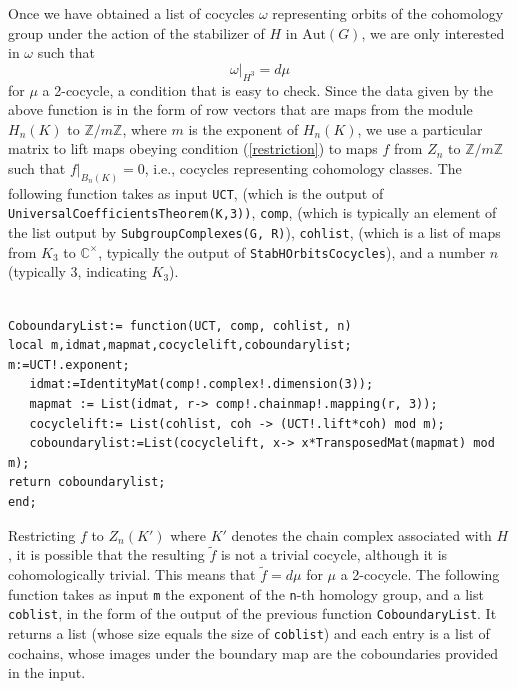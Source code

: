 \documentclass[11pt]{book}
\theoremstyle{Rem}
\theoremstyle{definition}
\numberwithin{equation}{section}
\newcommand\lstl{\lstinline}
\newcommand\CC{\mathbb C}
\newcommand\ZZ{\mathbb Z}
\begin{document}
Once we have obtained a list of cocycles $\omega$ representing orbits of the cohomology group under the action of the stabilizer of $H$ in $\text{Aut}(G)$, we are only interested in $\omega$ such that \begin{equation}\label{restriction}
	\omega|_{H^3} = d\mu
\end{equation} for $\mu$ a 2-cocycle, a condition that is easy to check. Since the data given by the above function is in the form of row vectors that are maps from the module $H_n(K)$ to $\ZZ/m\ZZ$, where $m$ is the exponent of $H_n(K)$, we use a particular matrix to lift maps obeying condition (\ref{restriction}) to maps $f$ from $Z_n$ to $\ZZ/m\ZZ$ such that $f|_{B_n(K)} = 0$, i.e., cocycles representing cohomology classes. The following function takes as input \lstl{UCT}, (which is the output of \lstl{UniversalCoefficientsTheorem(K,3))}, \lstl{comp}, (which is typically an element of the list output  by \lstl{SubgroupComplexes(G, R)}), \lstl{cohlist}, (which is a list of maps from $K_3$ to $\CC^\times$, typically the output of \lstl{StabHOrbitsCocycles}), and a number $n$ (typically 3, indicating $K_3$). 

\begin{lstlisting}

CoboundaryList:= function(UCT, comp, cohlist, n)
local m,idmat,mapmat,cocyclelift,coboundarylist;
m:=UCT!.exponent;
   idmat:=IdentityMat(comp!.complex!.dimension(3));
   mapmat := List(idmat, r-> comp!.chainmap!.mapping(r, 3));
   cocyclelift:= List(cohlist, coh -> (UCT!.lift*coh) mod m);
   coboundarylist:=List(cocyclelift, x-> x*TransposedMat(mapmat) mod m);
return coboundarylist;
end;
\end{lstlisting}

Restricting $f$ to $Z_n(K')$ where $K'$ denotes the chain complex associated with $H$, it is possible that the resulting $\tilde{f}$ is not a trivial cocycle, although it is cohomologically trivial. This means that $\tilde{f} = d\mu$ for $\mu$ a 2-cocycle. The following function takes as input \lstinline{m} the exponent of the \lstinline{n}-th homology group, and a list \lstl{coblist}, in the form of the output of the previous function \lstl{CoboundaryList}. It returns a list (whose size equals the size of \lstl{coblist}) and each entry is a list of cochains, whose images under the boundary map are the coboundaries provided in the input.
\end{document}
